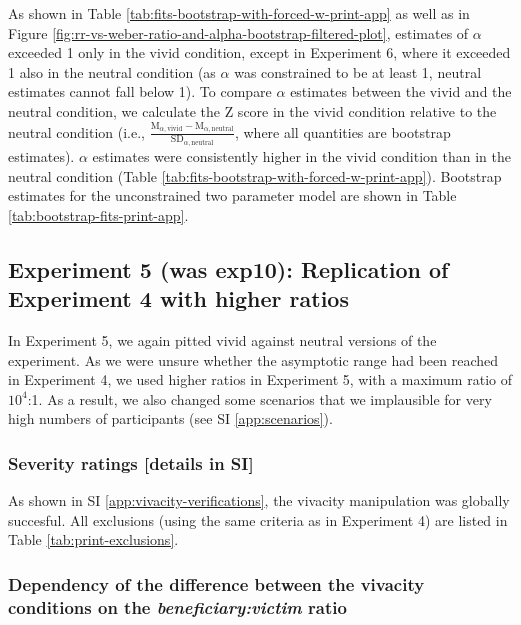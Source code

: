 \documentclass[
]{article}
\begin{document}
As shown in Table \ref{tab:fits-bootstrap-with-forced-w-print-app} as well as in Figure \ref{fig:rr-vs-weber-ratio-and-alpha-bootstrap-filtered-plot}, estimates of \(\alpha\) exceeded 1 only in the vivid condition, except in Experiment 6, where it exceeded 1 also in the neutral condition (as \(\alpha\) was constrained to be at least 1, neutral estimates cannot fall below 1). To compare \(\alpha\) estimates between the vivid and the neutral condition, we calculate the Z score in the vivid condition relative to the neutral condition (i.e., \(\frac{\text{M}_{\alpha,\text{vivid}} - \text{M}_{\alpha,\text{neutral}}}{\text{SD}_{\alpha,\text{neutral}}}\), where all quantities are bootstrap estimates). \(\alpha\) estimates were consistently higher in the vivid condition than in the neutral condition (Table \ref{tab:fits-bootstrap-with-forced-w-print-app}). Bootstrap estimates for the unconstrained two parameter model are shown in Table \ref{tab:bootstrap-fits-print-app}.

\subsection{Experiment 5 (was exp10): Replication of Experiment 4 with higher ratios}\label{experiment-5-was-exp10-replication-of-experiment-4-with-higher-ratios}

In Experiment 5, we again pitted vivid against neutral versions of the experiment. As we were unsure whether the asymptotic range had been reached in Experiment 4, we used higher ratios in Experiment 5, with a maximum ratio of \ensuremath{10^{4}}:1. As a result, we also changed some scenarios that we implausible for very high numbers of participants (see SI \ref{app:scenarios}).

\subsubsection{Severity ratings {[}details in SI{]}}\label{severity-ratings-details-in-si}

As shown in SI \ref{app:vivacity-verifications}, the vivacity manipulation was globally succesful. All exclusions (using the same criteria as in Experiment 4) are listed in Table \ref{tab:print-exclusions}.

\subsubsection{\texorpdfstring{Dependency of the difference between the vivacity conditions on the \emph{beneficiary:victim} ratio}{Dependency of the difference between the vivacity conditions on the beneficiary:victim ratio}}\label{dependency-of-the-difference-between-the-vivacity-conditions-on-the-beneficiaryvictim-ratio-1}
\end{document}
